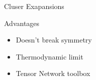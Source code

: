 \begin{frame}{Cluser Exapansions}
\begin{minipage}{0.49\textwidth}
{        }

         {
            \clustFullB
        }

    \end{minipage}
\end{frame}

\begin{frame}{Advantages}
    \begin{itemize}
        \item Doesn't break symmetry
        \item Thermodynamic limit
        \item Tensor Network toolbox
    \end{itemize}
\end{frame}

